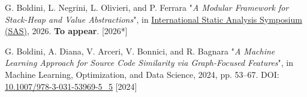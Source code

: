 


\begin{cvhonors}

\cvhonor
    {G. Boldini, L. Negrini, L. Olivieri, and P. Ferrara}
    {"\textit{A Modular Framework for Stack-Heap and Value Abstractions}",
     in \href{https://conf.researchr.org/home/splash-issta-2026/sas-2026}{International Static Analysis Symposium (SAS)}, 2026. \textbf{To appear}.}
    {}
    {[2026*]}

\cvhonor
    {G. Boldini, A. Diana, V. Arceri, V. Bonnici, and R. Bagnara}
    {"\textit{A Machine Learning Approach for Source Code Similarity via Graph-Focused Features}",
     in Machine Learning, Optimization, and Data Science, 2024, pp. 53–67.
     DOI: \href{https://doi.org/10.1007/978-3-031-53969-5_5}{10.1007/978-3-031-53969-5\_5}}
    {}
    {[2024]}

\end{cvhonors}
